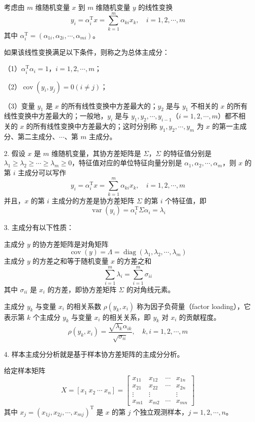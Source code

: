 \documentclass[UTF8, 12pt, fontset=fandol, oneside]{ctexart}
\begin{document}
考虑由 $m$ 维随机变量 $x$ 到 $m$ 维随机变量 $y$ 的线性变换
\[
y_i=\alpha_i^{\mathrm{T}}x=\sum_{k=1}^m\alpha_{ki}x_k,\quad i=1,2,\cdots,m
\]
其中 $\alpha_i^{\mathrm{T}}=(\alpha_{1i},\alpha_{2i},\cdots,\alpha_{mi})$。

如果该线性变换满足以下条件，则称之为总体主成分：

（1）$\alpha_i^{\mathrm{T}}\alpha_i=1$，$i=1,2,\cdots,m$；

（2）$\operatorname{cov}(y_i,y_j)=0(i\neq j)$；

（3）变量 $y_1$ 是 $x$ 的所有线性变换中方差最大的；$y_2$ 是与 $y_1$ 不相关的 $x$ 的所有线性变换中方差最大的；一般地，$y_i$ 是与 $y_1,y_2,\cdots,y_{i-1}$（$i=1,2,\cdots,m$）都不相关的 $x$ 的所有线性变换中方差最大的；这时分别称 $y_1,y_2,\cdots,y_m$ 为 $x$ 的第一主成分、第二主成分、$\cdots$、第 $m$ 主成分。

2. 假设 $x$ 是 $m$ 维随机变量，其协方差矩阵是 $\Sigma$，$\Sigma$ 的特征值分别是 $\lambda_1\geqslant\lambda_2\geqslant\cdots\geqslant\lambda_m\geqslant0$，特征值对应的单位特征向量分别是 $\alpha_1,\alpha_2,\cdots,\alpha_m$，则 $x$ 的第 $i$ 主成分可以写作
\[
y_i=\alpha_i^{\mathrm{T}}x=\sum_{k=1}^m\alpha_{ki}x_k,\quad i=1,2,\cdots,m
\]
并且，$x$ 的第 $i$ 主成分的方差是协方差矩阵 $\Sigma$ 的第 $i$ 个特征值，即
\[
\operatorname{var}(y_i)=\alpha_i^{\mathrm{T}}\Sigma\alpha_i=\lambda_i
\]

3. 主成分有以下性质：

主成分 $y$ 的协方差矩阵是对角矩阵
\[
\operatorname{cov}(y)=\Lambda=\operatorname{diag}(\lambda_1,\lambda_2,\cdots,\lambda_m)
\]
主成分 $y$ 的方差之和等于随机变量 $x$ 的方差之和
\[
\sum_{i=1}^m\lambda_i=\sum_{i=1}^m\sigma_{ii}
\]
其中 $\sigma_{ii}$ 是 $x_i$ 的方差，即协方差矩阵 $\Sigma$ 的对角线元素。

主成分 $y_k$ 与变量 $x_i$ 的相关系数 $\rho(y_k,x_i)$ 称为因子负荷量（factor loading），它表示第 $k$ 个主成分 $y_k$ 与变量 $x_i$ 的相关关系，即 $y_k$ 对 $x_i$ 的贡献程度。
\[
\rho(y_k,x_i)=\frac{\sqrt{\lambda_k}\alpha_{ik}}{\sqrt{\sigma_{ii}}},\quad k,i=1,2,\cdots,m
\]

4. 样本主成分分析就是基于样本协方差矩阵的主成分分析。

给定样本矩阵
\[
X=[x_1\ x_2\ \cdots\ x_n]=
\begin{bmatrix}
x_{11} & x_{12} & \cdots & x_{1n}\\
x_{21} & x_{22} & \cdots & x_{2n}\\
\vdots & \vdots & & \vdots\\
x_{m1} & x_{m2} & \cdots & x_{mn}
\end{bmatrix}
\]
其中 $x_j=(x_{1j},x_{2j},\cdots,x_{mj})^{\mathrm{T}}$ 是 $x$ 的第 $j$ 个独立观测样本，$j=1,2,\cdots,n$。
\end{document}
